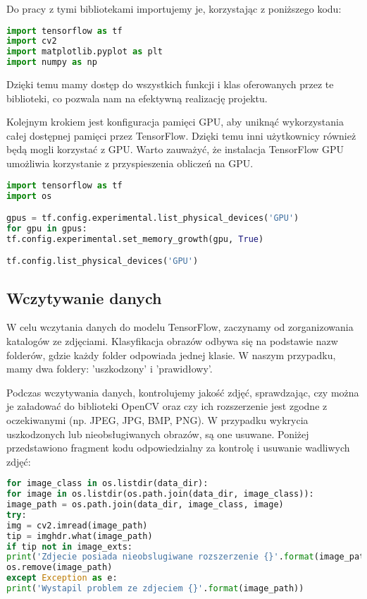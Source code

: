 Do pracy z tymi bibliotekami importujemy je, korzystając z poniższego kodu:

\begin{lstlisting}[language=Python]
import tensorflow as tf
import cv2
import matplotlib.pyplot as plt
import numpy as np
\end{lstlisting}

Dzięki temu mamy dostęp do wszystkich funkcji i klas oferowanych przez te biblioteki, co pozwala nam na efektywną realizację projektu.

Kolejnym krokiem jest konfiguracja pamięci GPU, aby uniknąć wykorzystania całej dostępnej pamięci przez TensorFlow. Dzięki temu inni użytkownicy również będą mogli korzystać z GPU. Warto zauważyć, że instalacja TensorFlow GPU umożliwia korzystanie z przyspieszenia obliczeń na GPU.

\begin{lstlisting}[language=Python]
import tensorflow as tf
import os

gpus = tf.config.experimental.list_physical_devices('GPU')
for gpu in gpus:
tf.config.experimental.set_memory_growth(gpu, True)

tf.config.list_physical_devices('GPU')
\end{lstlisting}

\subsection{Wczytywanie danych}
W celu wczytania danych do modelu TensorFlow, zaczynamy od zorganizowania katalogów ze zdjęciami. Klasyfikacja obrazów odbywa się na podstawie nazw folderów, gdzie każdy folder odpowiada jednej klasie. W naszym przypadku, mamy dwa foldery: 'uszkodzony' i 'prawidłowy'.

Podczas wczytywania danych, kontrolujemy jakość zdjęć, sprawdzając, czy można je załadować do biblioteki OpenCV oraz czy ich rozszerzenie jest zgodne z oczekiwanymi (np. JPEG, JPG, BMP, PNG). W przypadku wykrycia uszkodzonych lub nieobsługiwanych obrazów, są one usuwane. Poniżej przedstawiono fragment kodu odpowiedzialny za kontrolę i usuwanie wadliwych zdjęć:

\begin{lstlisting}[language=Python]
for image_class in os.listdir(data_dir):
for image in os.listdir(os.path.join(data_dir, image_class)):
image_path = os.path.join(data_dir, image_class, image)
try:
img = cv2.imread(image_path)
tip = imghdr.what(image_path)
if tip not in image_exts:
print('Zdjecie posiada nieobslugiwane rozszerzenie {}'.format(image_path))
os.remove(image_path)
except Exception as e:
print('Wystapil problem ze zdjeciem {}'.format(image_path))
\end{lstlisting}

